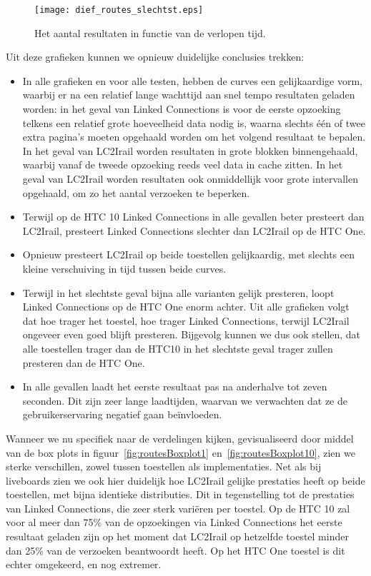 \begin{figure}[h]
	\centering
	\texttt{[image: dief\_routes\_slechtst.eps]}
	\caption[Aantal resultaten routes in functie van de tijd]{Het aantal resultaten in functie van de verlopen tijd.}
	\label{fig:routesDiefSlechtst}
\end{figure}

Uit deze grafieken kunnen we opnieuw duidelijke conclusies trekken:
\begin{itemize}
	\item In alle grafieken en voor alle testen, hebben de curves een gelijkaardige vorm, waarbij er na een relatief lange wachttijd aan snel tempo resultaten geladen worden: in het geval van Linked Connections is voor de eerste opzoeking telkens een relatief grote hoeveelheid data nodig is, waarna slechts één of twee extra pagina's moeten opgehaald worden om het volgend resultaat te bepalen. In het geval van LC2Irail worden resultaten in grote blokken binnengehaald, waarbij vanaf de tweede opzoeking reeds veel data in cache zitten. In het geval van LC2Irail worden resultaten ook onmiddellijk voor grote intervallen opgehaald, om zo het aantal verzoeken te beperken. 
	\item Terwijl op de HTC 10 Linked Connections in alle gevallen beter presteert dan LC2Irail, presteert Linked Connections slechter dan LC2Irail op de HTC One. 
	\item Opnieuw presteert LC2Irail op beide toestellen gelijkaardig, met slechts een kleine verschuiving in tijd tussen beide curves.
	\item Terwijl in het slechtste geval bijna alle varianten gelijk presteren, loopt Linked Connections op de HTC One enorm achter. Uit alle grafieken volgt dat hoe trager het toestel, hoe trager Linked Connections, terwijl LC2Irail ongeveer even goed blijft presteren. Bijgevolg kunnen we dus ook stellen, dat alle toestellen trager dan de HTC10 in het slechtste geval trager zullen presteren dan de HTC One.
	\item In alle gevallen laadt het eerste resultaat pas na anderhalve tot zeven seconden. Dit zijn zeer lange laadtijden, waarvan we verwachten dat ze de gebruikerservaring negatief gaan beïnvloeden.
\end{itemize}

Wanneer we nu specifiek naar de verdelingen kijken, gevisualiseerd door middel van de box plots in figuur~\ref{fig:routesBoxplot1} en~\ref{fig:routesBoxplot10}, zien we sterke verschillen, zowel tussen toestellen als implementaties. Net als bij liveboards zien we ook hier duidelijk hoe LC2Irail gelijke prestaties heeft op beide toestellen, met bijna identieke distributies. Dit in tegenstelling tot de prestaties van Linked Connections, die zeer sterk variëren per toestel. Op de HTC 10 zal voor al meer dan 75\% van de opzoekingen via Linked Connections het eerste resultaat geladen zijn op het moment dat LC2Irail op hetzelfde toestel minder dan 25\% van de verzoeken beantwoordt heeft. Op het HTC One toestel is dit echter omgekeerd, en nog extremer. 

